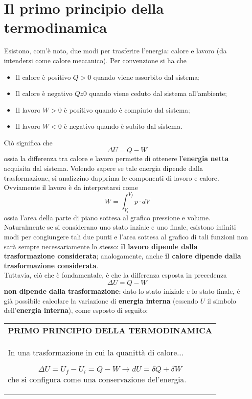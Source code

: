 \documentclass[a4paper]{extarticle}
\renewcommand\arraystretch{}
\begin{document}
\section{Il primo principio della termodinamica}
Esistono, com'è noto, due modi per trasferire l'energia: calore e lavoro (da intendersi come calore meccanico). Per convenzione si ha che
\begin{itemize}
  \item Il calore è positivo $Q > 0$ quando viene assorbito dal sistema;
  \item Il calore è negativo $Q z 0$ quando viene ceduto dal sistema all'ambiente;
  \item Il lavoro $W > 0$ è positivo quando è compiuto dal sistema;
  \item Il lavoro $W < 0$ è negativo quando è subito dal sistema.
\end{itemize}
Ciò significa che
\[\boxed{\Delta U=Q-W}\]
ossia la differenza tra calore e lavoro permette di ottenere l'\textbf{energia netta} acquisita dal sistema. Volendo sapere se tale energia dipende dalla trasformazione, si analizzino dapprima le componenti di lavoro e calore.\\
Ovviamente il lavoro è da interpretarsi come
\[W=\int_{V_i}^{V_f} p \cdot dV\]
ossia l'area della parte di piano sottesa al grafico pressione e volume. Naturalmente se si considerano uno stato inziale e uno finale, esistono infiniti modi per congiungere tali due punti e l'area sottesa al grafico di tali funzioni non sarà sempre necessariamente lo stesso: \textbf{il lavoro dipende dalla trasformazione considerata}; analogamente, anche \textbf{il calore dipende dalla trasformazione considerata}.\\
Tuttavia, ciò che è fondamentale, è che la differenza esposta in precedenza
\[\boxed{\Delta U=Q-W}\]
\textbf{non dipende dalla trasformazione}: dato lo stato iniziale e lo stato finale, è già possibile calcolare la variazione di \textbf{energia interna} (essendo $U$ il simbolo dell'\textbf{energia interna}), come esposto di seguito:

\vspace{1em}
\setlength{\tabcolsep}{14pt}
\renewcommand{\arraystretch}{2}
\noindent
\begin{tabularx}{\textwidth}{@{}|P|@{}}
    \hline
    {\textbf{PRIMO PRINCIPIO DELLA TERMODINAMICA}}\\
    \parbox{\linewidth}{In una trasformazione in cui la quanittà di calore...

    \[\boxed{\Delta U = U_f - U_i = Q - W \longrightarrow dU = \delta Q + \delta W}\]
    che si configura come una conservazione del'energia.
    \vspace{3mm}}\\
    \hline
\end{tabularx}
\end{document}
